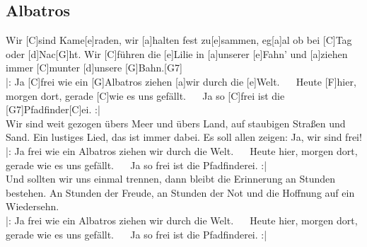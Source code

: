 \documentclass[10pt,a5paper,twoside]{scrbook}
\begin{document}
\subsection{Albatros}
\begin{guitar}
Wir [C]sind Kame[e]raden, wir [a]halten fest zu[e]sammen,
eg[a]al ob bei [C]Tag oder [d]Nac[G]ht.
Wir [C]führen die [e]Lilie in [a]unserer [e]Fahn'
und [a]ziehen immer [C]munter [d]unsere [G]Bahn.[G7]
\\
|: Ja [C]frei wie ein [G]Albatros ziehen [a]wir durch die [e]Welt.
~~ Heute [F]hier, morgen dort, gerade [C]wie es uns gefällt.
~~ Ja so [C]frei ist die [G7]Pfadfinder[C]ei. :|
\\
Wir sind weit gezogen übers Meer und übers Land,
auf staubigen Straßen und Sand.
Ein lustiges Lied, das ist immer dabei.
Es soll allen zeigen: Ja, wir sind frei!
\\
|: Ja frei wie ein Albatros ziehen wir durch die Welt.
~~ Heute hier, morgen dort, gerade wie es uns gefällt. 
~~ Ja so frei ist die Pfadfinderei. :|
\\
Und sollten wir uns einmal trennen, dann bleibt
die Erinnerung an Stunden bestehen.
An Stunden der Freude, an Stunden der Not 
und die Hoffnung auf ein Wiedersehn.
\\
|: Ja frei wie ein Albatros ziehen wir durch die Welt.
~~ Heute hier, morgen dort, gerade wie es uns gefällt. 
~~ Ja so frei ist die Pfadfinderei. :|
\end{guitar}

  	
  	  
\newpage  
  	
\end{document}
